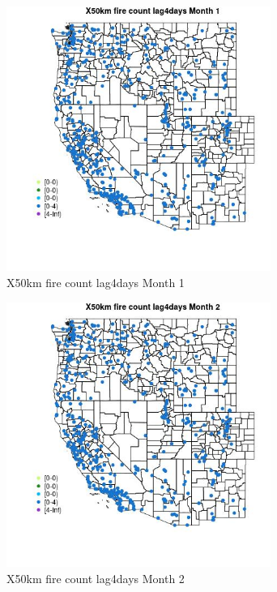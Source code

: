 \begin{figure} 
\centering  
\includegraphics[width=0.77\textwidth]{Code_Outputs/Report_ML_input_PM25_Step4_part_e_de_duplicated_aves_compiled_2019-05-14wNAs_MapObsMo1X50km_fire_count_lag4days.jpg} 
\caption{\label{fig:Report_ML_input_PM25_Step4_part_e_de_duplicated_aves_compiled_2019-05-14wNAsMapObsMo1X50km_fire_count_lag4days}X50km fire count lag4days Month 1} 
\end{figure} 
 

\clearpage 

\begin{figure} 
\centering  
\includegraphics[width=0.77\textwidth]{Code_Outputs/Report_ML_input_PM25_Step4_part_e_de_duplicated_aves_compiled_2019-05-14wNAs_MapObsMo2X50km_fire_count_lag4days.jpg} 
\caption{\label{fig:Report_ML_input_PM25_Step4_part_e_de_duplicated_aves_compiled_2019-05-14wNAsMapObsMo2X50km_fire_count_lag4days}X50km fire count lag4days Month 2} 
\end{figure} 
 

